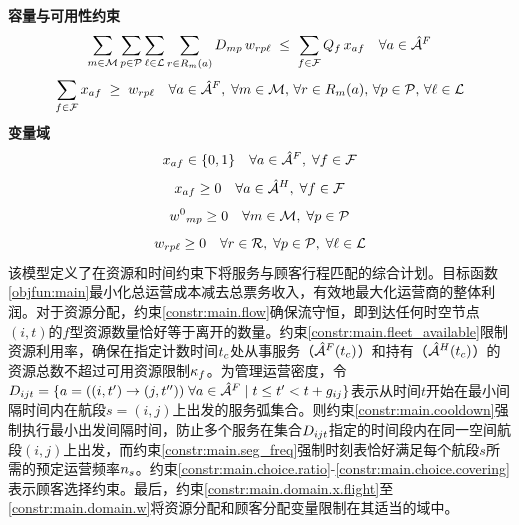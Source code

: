 {\begin{equation}
    \label{constr:main.choice.limit}
\end{equation}
\noindent\textbf{容量与可用性约束}
\begin{equation}
    \sum_{m\in \mathcal{M}}\sum_{p\in \mathcal{P}}\sum_{\ell\in \mathcal{L}}\sum_{r\in R_{m}(a)} 
    D_{mp}\, w_{rp\ell}\;\le\; \sum_{f\in \mathcal{F}} Q_{f}\, x_{af}
    \quad \forall a\in {\hat{\mathcal{A}}^F_{{}}}
    \label{constr:main.choice.capacity}
\end{equation}
\begin{equation}
    \sum_{f\in \mathcal{F}} x_{af} \;\ge\; w_{rp\ell}
    \quad \forall a\in {\hat{\mathcal{A}}^F_{{}}},\; \forall m\in \mathcal{M},\, \forall r\in R_{m}(a),\, \forall p\in \mathcal{P},\,\forall \ell\in\mathcal{L}
    \label{constr:main.choice.covering}
\end{equation}
\noindent\textbf{变量域}
\begin{equation}
    x_{af}\in\{0,1\} \quad \forall a\in {\hat{\mathcal{A}}^F_{{}}}, \; \forall f\in \mathcal{F}
    \label{constr:main.domain.x.flight}
\end{equation}
\begin{equation}
    x_{af}\ge 0 \quad \forall a\in {\hat{\mathcal{A}}^H_{{}}}, \; \forall f\in \mathcal{F}
    \label{constr:main.domain.x.holding}
\end{equation}
\begin{equation}
    {w^0}_{mp}\ge 0 \quad \forall m\in \mathcal{M}, \; \forall p\in \mathcal{P}
    \label{constr:main.domain.w.out}
\end{equation}
\begin{equation}
    w_{rp\ell}\ge 0 \quad \forall r\in \mathcal{R}, \; \forall p\in \mathcal{P}, \; \forall \ell\in \mathcal{L}
    \label{constr:main.domain.w}
\end{equation}
}
该模型定义了在资源和时间约束下将服务与顾客行程匹配的综合计划。目标函数\eqref{objfun:main}最小化总运营成本减去总票务收入，有效地最大化运营商的整体利润。对于资源分配，约束\eqref{constr:main.flow}确保流守恒，即到达任何时空节点$(i, t)$的$f$型资源数量恰好等于离开的数量。约束\eqref{constr:main.fleet_available}限制资源利用率，确保在指定计数时间$t_c$处从事服务（${\hat{\mathcal{A}}^F(t_c)}$）和持有（${\hat{\mathcal{A}}^H(t_c)}$）的资源总数不超过可用资源限制$\kappa_f$。为管理运营密度，令$D_{ijt} = \{a=((i,t^\prime)\rightarrow(j,t^{\prime\prime}))\;\forall a\in{\hat{\mathcal{A}}^F_{{}}}\mid t\leq t^\prime<t+g_{ij} \}$表示从时间$t$开始在最小间隔时间内在航段$s=(i,j)$上出发的服务弧集合。则约束\eqref{constr:main.cooldown}强制执行最小出发间隔时间，防止多个服务在集合$D_{ijt}$指定的时间段内在同一空间航段$(i,j)$上出发，而约束\eqref{constr:main.seg_freq}强制时刻表恰好满足每个航段$s$所需的预定运营频率$n_s$。约束\eqref{constr:main.choice.ratio}-\eqref{constr:main.choice.covering}表示顾客选择约束。最后，约束\eqref{constr:main.domain.x.flight}至\eqref{constr:main.domain.w}将资源分配和顾客分配变量限制在其适当的域中。

